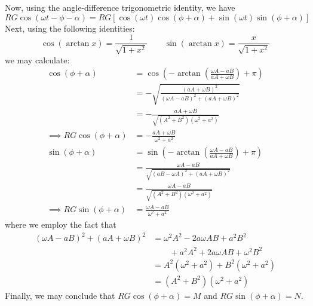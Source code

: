 \documentclass[a4paper]{article}
\begin{document}
Now, using the angle-difference trigonometric identity, we have
\[
	RG \cos\left( \omega t - \phi - \alpha  \right) = RG \left[  \cos\left( \omega t \right) \cos\left( \phi + \alpha  \right) + \sin \!\left( \omega t \right) \sin \!\left( \phi + \alpha  \right) \right]
\]
Next, using the following identities:
\[
	\cos\left( \arctan x \right) = \frac{1}{\sqrt{1 + x^{2}}} \qquad \sin\left( \arctan x \right) = \frac{x}{\sqrt{1 + x^{2}}}
\]
we may calculate:
\begin{align*}
	\cos\left( \phi + \alpha  \right) & = \cos\left( - \arctan \!\left( \frac{\omega A - aB}{aA + \omega B} \right) + \pi  \right) \\
	 & = -\sqrt{\frac{\!\left( aA + \omega B \right)^{2}}{\!\left( \omega A - aB \right)^{2} + \!\left( aA + \omega B \right)^{2}}} \\
	 & = -\frac{aA + \omega B}{\sqrt{\!\left( A^{2} + B^{2} \right) \!\left( \omega^{2} + a^{2} \right) }} \\
	\implies RG \cos\left( \phi + \alpha  \right) & = \boxed{-\frac{aA + \omega B}{\omega^{2} + a^{2}}} \\
	\sin\left( \phi + \alpha  \right) & = \sin\left( -\arctan \!\left( \frac{\omega A - aB}{aA + \omega B} \right) + \pi  \right) \\
		& = \frac{\omega A - aB}{\sqrt{\!\left( aB - \omega A \right)^{2} + \!\left( aA + \omega B \right)^{2}}} \\
		& = \frac{\omega A - aB}{\sqrt{\!\left( A^{2} + B^{2} \right) \!\left( \omega^{2} + a^{2} \right) }} \\
	\implies RG \sin\left( \phi + \alpha  \right) & = \boxed{\frac{\omega A - aB}{\omega^{2} + a^{2}}}
\end{align*}
where we employ the fact that
\begin{align*}
	\!\left( \omega A - aB \right)^{2} + \!\left( aA + \omega B \right)^{2} & = \omega^{2}A^{2} - 2a \omega AB + a^{2}B^{2} \\
	 & \qquad + a^{2} A^{2} + 2a \omega AB + \omega^{2} B^{2} \\ 
	 & = A^{2} \!\left( \omega^{2} + a^{2} \right) + B^{2} \!\left( \omega^{2} + a^{2} \right) \\
	 & = \!\left( A^{2} + B^{2} \right) \!\left( \omega^{2} + a^{2} \right) 
\end{align*}
Finally, we may conclude that \(RG \cos\left( \phi + \alpha  \right) = M\) and \(RG \sin\left( \phi + \alpha  \right) = N\).

\vspace{12pt}
\end{document}
